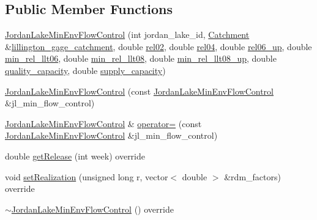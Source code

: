 \subsection*{Public Member Functions}
\begin{DoxyCompactItemize}
\item 
\mbox{\hyperlink{classJordanLakeMinEnvFlowControl_ac8e2b846b66115c2db3bc4ea3ed44297_ac8e2b846b66115c2db3bc4ea3ed44297}{Jordan\+Lake\+Min\+Env\+Flow\+Control}} (int jordan\+\_\+lake\+\_\+id, \mbox{\hyperlink{classCatchment}{Catchment}} \&\mbox{\hyperlink{classJordanLakeMinEnvFlowControl_a7f219e0a63dd4171df6ce7954f32904f_a7f219e0a63dd4171df6ce7954f32904f}{lillington\+\_\+gage\+\_\+catchment}}, double \mbox{\hyperlink{classJordanLakeMinEnvFlowControl_ad093178e42f3ceb287d22a961c47f186_ad093178e42f3ceb287d22a961c47f186}{rel02}}, double \mbox{\hyperlink{classJordanLakeMinEnvFlowControl_ada2755ec609acff7761acf707daf798c_ada2755ec609acff7761acf707daf798c}{rel04}}, double \mbox{\hyperlink{classJordanLakeMinEnvFlowControl_ad1dd5a5959f7f43f966a53002dec1f2b_ad1dd5a5959f7f43f966a53002dec1f2b}{rel06\+\_\+up}}, double \mbox{\hyperlink{classJordanLakeMinEnvFlowControl_a3defdfb0e3c8bb9f222b086cb93b7852_a3defdfb0e3c8bb9f222b086cb93b7852}{min\+\_\+rel\+\_\+llt06}}, double \mbox{\hyperlink{classJordanLakeMinEnvFlowControl_a3cf68a0987b00668e3b8e582830f05db_a3cf68a0987b00668e3b8e582830f05db}{min\+\_\+rel\+\_\+llt08}}, double \mbox{\hyperlink{classJordanLakeMinEnvFlowControl_ad6367768fdfff0af0d347ae2ca7e1821_ad6367768fdfff0af0d347ae2ca7e1821}{min\+\_\+rel\+\_\+llt08\+\_\+up}}, double \mbox{\hyperlink{classJordanLakeMinEnvFlowControl_a671f40efb6f6d3ada453d5d261fc7ebc_a671f40efb6f6d3ada453d5d261fc7ebc}{quality\+\_\+capacity}}, double \mbox{\hyperlink{classJordanLakeMinEnvFlowControl_a028ed65d1a68c0462334d949ccf19ce2_a028ed65d1a68c0462334d949ccf19ce2}{supply\+\_\+capacity}})
\item 
\mbox{\hyperlink{classJordanLakeMinEnvFlowControl_a44dfb259a9b61886b9acfcb3bec96c0f_a44dfb259a9b61886b9acfcb3bec96c0f}{Jordan\+Lake\+Min\+Env\+Flow\+Control}} (const \mbox{\hyperlink{classJordanLakeMinEnvFlowControl}{Jordan\+Lake\+Min\+Env\+Flow\+Control}} \&jl\+\_\+min\+\_\+flow\+\_\+control)
\item 
\mbox{\hyperlink{classJordanLakeMinEnvFlowControl}{Jordan\+Lake\+Min\+Env\+Flow\+Control}} \& \mbox{\hyperlink{classJordanLakeMinEnvFlowControl_a939dc49f5e9a80a2f9a3c9c6bdce98fb_a939dc49f5e9a80a2f9a3c9c6bdce98fb}{operator=}} (const \mbox{\hyperlink{classJordanLakeMinEnvFlowControl}{Jordan\+Lake\+Min\+Env\+Flow\+Control}} \&jl\+\_\+min\+\_\+flow\+\_\+control)
\item 
double \mbox{\hyperlink{classJordanLakeMinEnvFlowControl_a5c2456c26fa141824c247cd15bf5c57d_a5c2456c26fa141824c247cd15bf5c57d}{get\+Release}} (int week) override
\item 
void \mbox{\hyperlink{classJordanLakeMinEnvFlowControl_aa1e816121060212f3dbeffda90a7baec_aa1e816121060212f3dbeffda90a7baec}{set\+Realization}} (unsigned long r, vector$<$ double $>$ \&rdm\+\_\+factors) override
\item 
\mbox{\hyperlink{classJordanLakeMinEnvFlowControl_a97c9cefc5e56d0bee8075a7c1616143e_a97c9cefc5e56d0bee8075a7c1616143e}{$\sim$\+Jordan\+Lake\+Min\+Env\+Flow\+Control}} () override
\end{DoxyCompactItemize}
